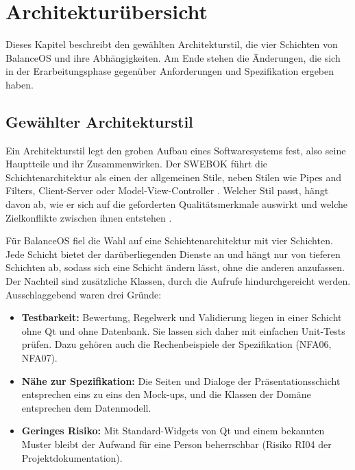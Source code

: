 \section{Architekturübersicht}
Dieses Kapitel beschreibt den gewählten Architekturstil, die vier Schichten von BalanceOS und ihre Abhängigkeiten. Am Ende stehen die Änderungen, die sich in der Erarbeitungsphase gegenüber Anforderungen und Spezifikation ergeben haben.

\subsection{Gewählter Architekturstil}
Ein Architekturstil legt den groben Aufbau eines Softwaresystems fest, also seine Hauptteile und ihr Zusammenwirken. Der \ac{SWEBOK} führt die Schichtenarchitektur als einen der allgemeinen Stile, neben Stilen wie Pipes and Filters, Client-Server oder Model-View-Controller \parencite[S.~2-6]{swebok2026}. Welcher Stil passt, hängt davon ab, wie er sich auf die geforderten Qualitätsmerkmale auswirkt und welche Zielkonflikte zwischen ihnen entstehen \parencite[S.~2-7]{swebok2026}.

Für BalanceOS fiel die Wahl auf eine Schichtenarchitektur mit vier Schichten. Jede Schicht bietet der darüberliegenden Dienste an und hängt nur von tieferen Schichten ab, sodass sich eine Schicht ändern lässt, ohne die anderen anzufassen. Der Nachteil sind zusätzliche Klassen, durch die Aufrufe hindurchgereicht werden. Ausschlaggebend waren drei Gründe:
\begin{itemize}
  \item \textbf{Testbarkeit:} Bewertung, Regelwerk und Validierung liegen in einer Schicht ohne Qt und ohne Datenbank. Sie lassen sich daher mit einfachen Unit-Tests prüfen. Dazu gehören auch die Rechenbeispiele der Spezifikation (NFA06, NFA07).
  \item \textbf{Nähe zur Spezifikation:} Die Seiten und Dialoge der Präsentationsschicht entsprechen eins zu eins den Mock-ups, und die Klassen der Domäne entsprechen dem Datenmodell.
  \item \textbf{Geringes Risiko:} Mit Standard-Widgets von Qt und einem bekannten Muster bleibt der Aufwand für eine Person beherrschbar (Risiko RI04 der Projektdokumentation).
\end{itemize}

